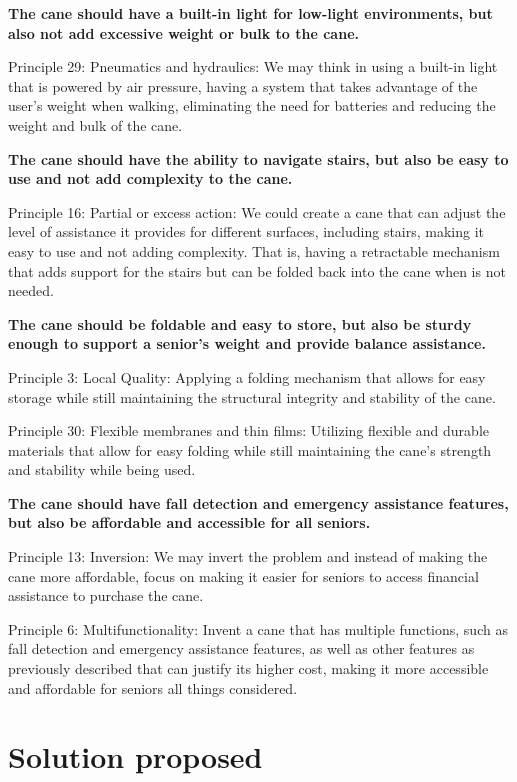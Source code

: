 \documentclass[12pt, twoside]{report}
\begin{document}
\textbf{The cane should have a built-in light for low-light environments, but also not add excessive weight or bulk to the cane.}

Principle 29: Pneumatics and hydraulics: We may think in using a built-in light that is powered by air pressure, having a system that takes advantage of the user’s weight when walking, eliminating the need for batteries and reducing the weight and bulk of the cane.

\textbf{The cane should have the ability to navigate stairs, but also be easy to use and not add complexity to the cane.}

Principle 16: Partial or excess action: We could create a cane that can adjust the level of assistance it provides for different surfaces, including stairs, making it easy to use and not adding complexity. That is, having a retractable mechanism that adds support for the stairs but can be folded back into the cane when is not needed.

\textbf{The cane should be foldable and easy to store, but also be sturdy enough to support a senior's weight and provide balance assistance.}

Principle 3: Local Quality: Applying a folding mechanism that allows for easy storage while still maintaining the structural integrity and stability of the cane.

Principle 30: Flexible membranes and thin films: Utilizing flexible and durable materials that allow for easy folding while still maintaining the cane's strength and stability while being used.

\textbf{The cane should have fall detection and emergency assistance features, but also be affordable and accessible for all seniors.}

Principle 13: Inversion: We may invert the problem and instead of making the cane more affordable, focus on making it easier for seniors to access financial assistance to purchase the cane.

Principle 6: Multifunctionality: Invent a cane that has multiple functions, such as fall detection and emergency assistance features, as well as other features as previously described that can justify its higher cost, making it more accessible and affordable for seniors all things considered.


\section{Solution proposed}
\end{document}
